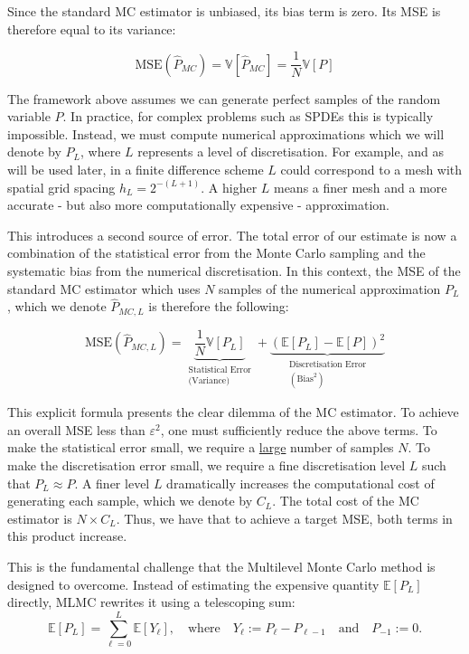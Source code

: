 Since the standard MC estimator is unbiased, its bias term is zero. 
Its MSE is therefore equal to its variance:

\begin{equation*}
    \text{MSE}(\hat{P}_{MC}) = \mathbb{V}[\hat{P}_{MC}] = \frac{1}{N}\mathbb{V}[P]
\end{equation*}

The framework above assumes we can generate perfect samples of the random 
variable $P$. In practice, for complex problems such as SPDEs this is typically impossible.
Instead, we must compute numerical approximations which we will denote by $P_L$, where $L$ 
represents a level of discretisation. For example, and as will be used later,
in a finite difference scheme $L$ could correspond to a mesh with spatial grid spacing 
$h_L = 2^{-(L+1)}$. A higher $L$ means a finer mesh and a more accurate - but also more 
computationally expensive - approximation. 

This introduces a second source of error. The total error of our estimate is now a combination 
of the statistical error from the Monte Carlo sampling and the systematic bias from the
numerical discretisation. In this context, the MSE of the standard MC estimator which uses 
$N$ samples of the numerical approximation $P_L$, which we denote $\hat{P}_{MC, L}$ is therefore 
the following:

\begin{equation}
    \text{MSE}(\hat{P}_{MC,L}) = \underbrace{\frac{1}{N}\mathbb{V}[P_L]}_{\substack{\text{Statistical Error} \\ \text{(Variance)}}} + 
    \underbrace{(\mathbb{E}[P_L] - \mathbb{E}[P])^2}_{\substack{\text{Discretisation Error} \\ (\text{Bias}^2)}}
\end{equation}

This explicit formula presents the clear dilemma of the MC estimator. To achieve an overall
MSE less than  $\varepsilon^2$, one must sufficiently reduce the above terms.
To make the statistical error small, we require a \underline{large}
number of samples $N$.
To make the discretisation error small, we require a fine discretisation level $L$ such that
$P_L \approx P$. A finer level $L$ dramatically increases the computational cost 
of generating each sample, which we denote by $C_{L}$. The total cost of the 
MC estimator is $N \times C_L$.
Thus, we have that to achieve a target MSE, both terms in this product increase.

This is the fundamental challenge that the Multilevel Monte Carlo method is designed to overcome. 
Instead of estimating the expensive quantity $\mathbb{E}[P_L]$ directly, MLMC rewrites it 
using a telescoping sum:
\begin{equation*}
    \mathbb{E}[P_L] = \sum_{\ell=0}^L \mathbb{E}[Y_\ell], \quad \text{where} \quad Y_\ell := P_\ell - P_{\ell-1} \quad \text{and} \quad P_{-1} := 0.
\end{equation*}

